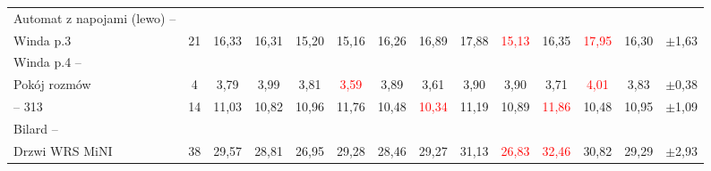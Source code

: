 \documentclass[14pt,a4paper]{extarticle}
\begin{document}
\begin{table}[H]
\begin{tabular}{|>{\centering\arraybackslash}m{3.1cm}|c|cccccccccc|c|c|}
\hline
Automat z napojami (lewo) --\\Winda p.3 & 21 & 16,33 & 16,31 & 15,20 & 15,16 & 16,26 & 16,89 & 17,88 & \textcolor{red}{15,13} & 16,35 & \textcolor{red}{17,95} & 16,30 & $\pm$1,63 \\
\hline
Winda p.4 --\\Pokój rozmów & 4 & 3,79 & 3,99 & 3,81 & \textcolor{red}{3,59} & 3,89 & 3,61 & 3,90 & 3,90 & 3,71 & \textcolor{red}{4,01} & 3,83 & $\pm$0,38 \\
\hline
316 -- 313 & 14 & 11,03 & 10,82 & 10,96 & 11,76 & 10,48 & \textcolor{red}{10,34} & 11,19 & 10,89 & \textcolor{red}{11,86} & 10,48 & 10,95 & $\pm$1,09 \\
\hline
Bilard --\\Drzwi WRS MiNI & 38 & 29,57 & 28,81 & 26,95 & 29,28 & 28,46 & 29,27 & 31,13 & \textcolor{red}{26,83} & \textcolor{red}{32,46} & 30,82 & 29,29 & $\pm$2,93 \\
\hline
\end{tabular}
\renewcommand{\arraystretch}{1.0}
\end{table}
\end{document}
